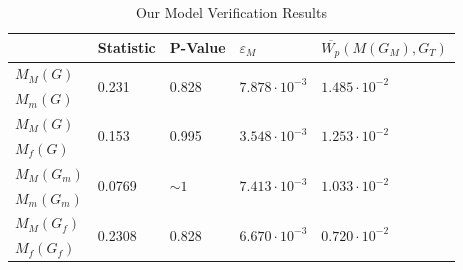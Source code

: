 {\begin{table}
	
	\caption{Our Model Verification Results}
    \begin{center}
	\begin{tabular}{|l|l|l|l|l|}
		\hline
		& Statistic & P-Value & $\varepsilon_M$ & $\overline{W_p}(M(G_{M}),G_{{T}})$ \\
		
		\hline
		$M_{M}(G)$  &\multirow{2}{*}{0.231}&\multirow{2}{*}{0.828 }     &      \multirow{2}{*}{$7.878\cdot10^{-3}$}    & \multirow{2}{*}{$1.485\cdot10^{-2}$}   \\ 
		
		$M_{m}(G)$          &         &       & &              \\ 
		\hline
		
		$M_{M}(G)$          &   \multirow{2}{*}{ 0.153  }      &     \multirow{2}{*}{ 0.995}     &      \multirow{2}{*}{ $3.548\cdot10^{-3}$ }            & \multirow{2}{*}{$1.253\cdot10^{-2}$} \\ 
		
		$M_{f}(G)$         &           &        &  &  \\     
		
		\hline
		$M_{M}(G_{m})$          &   \multirow{2}{*}{0.0769 }      &     \multirow{2}{*}{$\sim1$}     &      \multirow{2}{*}{$7.413\cdot10^{-3}$}           & \multirow{2}{*}{$1.033\cdot10^{-2}$}\\ 
		
		$M_{m}(G_{m})$          &         &       & &             \\ 
		\hline
		
		$M_{M}(G_{f})$          &   \multirow{2}{*}{0.2308 }      &     \multirow{2}{*}{0.828 }     &      \multirow{2}{*}{$6.670\cdot10^{-3}$ }            & \multirow{2}{*}{$0.720\cdot10^{-2}$}\\ 
		
		$M_{f}(G_{f})$         &           &    &    &    \\     
		\hline
	\end{tabular}
	\end{center}
\end{table}


}
